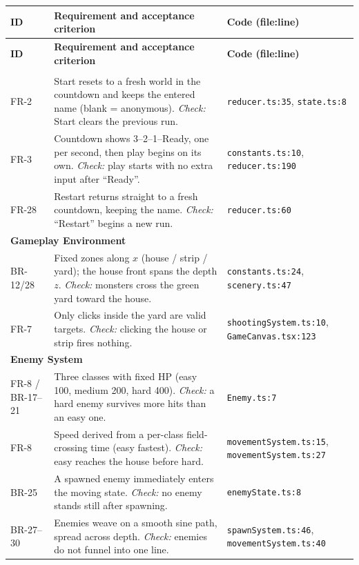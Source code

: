 \documentclass[12pt,a4paper]{report}
\begin{document}
\renewcommand{\arraystretch}{1.2}
\small
\begin{longtable}{|p{1.5cm}|p{7.9cm}|p{4.2cm}|}
\hline
\textbf{ID} & \textbf{Requirement and acceptance criterion} & \textbf{Code (file:line)} \\
\hline
\endfirsthead
\hline
\textbf{ID} & \textbf{Requirement and acceptance criterion} & \textbf{Code (file:line)} \\
\hline
\endhead
\hline
\endfoot
\hline
\endlastfoot

\multicolumn{3}{|l|}{\textbf{Game Session Management}} \\ \hline
FR-2 & Start resets to a fresh world in the countdown and keeps the entered name (blank = anonymous). \emph{Check:} Start clears the previous run. & \texttt{reducer.ts:35}, \texttt{state.ts:8} \\ \hline
FR-3 & Countdown shows 3--2--1--Ready, one per second, then play begins on its own. \emph{Check:} play starts with no extra input after ``Ready''. & \texttt{constants.ts:10}, \texttt{reducer.ts:190} \\ \hline
FR-28 & Restart returns straight to a fresh countdown, keeping the name. \emph{Check:} ``Restart'' begins a new run. & \texttt{reducer.ts:60} \\ \hline

\multicolumn{3}{|l|}{\textbf{Gameplay Environment}} \\ \hline
BR-12/28 & Fixed zones along $x$ (house / strip / yard); the house front spans the depth $z$. \emph{Check:} monsters cross the green yard toward the house. & \texttt{constants.ts:24}, \texttt{scenery.ts:47} \\ \hline
FR-7 & Only clicks inside the yard are valid targets. \emph{Check:} clicking the house or strip fires nothing. & \texttt{shootingSystem.ts:10}, \texttt{GameCanvas.tsx:123} \\ \hline

\multicolumn{3}{|l|}{\textbf{Enemy System}} \\ \hline
FR-8 / BR-17--21 & Three classes with fixed HP (easy 100, medium 200, hard 400). \emph{Check:} a hard enemy survives more hits than an easy one. & \texttt{Enemy.ts:7} \\ \hline
FR-8 & Speed derived from a per-class field-crossing time (easy fastest). \emph{Check:} easy reaches the house before hard. & \texttt{movementSystem.ts:15}, \texttt{movementSystem.ts:27} \\ \hline
BR-25 & A spawned enemy immediately enters the moving state. \emph{Check:} no enemy stands still after spawning. & \texttt{enemyState.ts:8} \\ \hline
BR-27--30 & Enemies weave on a smooth sine path, spread across depth. \emph{Check:} enemies do not funnel into one line. & \texttt{spawnSystem.ts:46}, \texttt{movementSystem.ts:40} \\ \hline


\end{longtable}
\end{document}
